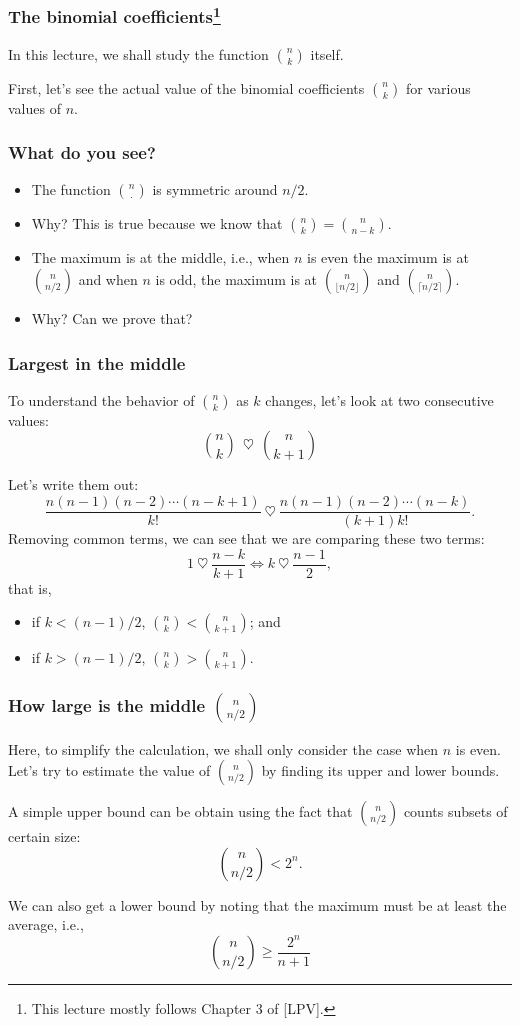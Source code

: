 

\begin{frame}\frametitle{The binomial coefficients\footnote{This lecture mostly follows Chapter 3 of [LPV].}}
  In this lecture, we shall study the function $\binom{n}{k}$ itself.

  First, let's see the actual value of the binomial coefficients
  $\binom{n}{k}$ for various values of $n$.  \vspace{2in}
\end{frame}

\begin{frame}\frametitle{What do you see?}
  \begin{itemize}
  \item The function $\binom{n}{\cdot}$ is symmetric around $n/2$.
  \item Why? \pause This is true because we know that $\binom{n}{k}=\binom{n}{n-k}$. \pause
  \item The maximum is at the middle, i.e., when $n$ is even the
    maximum is at $\binom{n}{n/2}$ and when $n$ is odd, the maximum is
    at $\binom{n}{\lfloor n/2 \rfloor}$ and $\binom{n}{\lceil
      n/2\rceil}$.
  \item Why? \pause Can we prove that?
  \end{itemize}
\end{frame}

\begin{frame}\frametitle{Largest in the middle}
  To understand the behavior of $\binom{n}{k}$ as $k$ changes, let's
  look at two consecutive values:
  \[ \binom{n}{k} \ \ \heartsuit \ \ \binom{n}{k+1}\]
  \pause

  Let's write them out:
  \[ \frac{n(n-1)(n-2)\cdots(n-k+1)}{k!} \ \heartsuit \ \frac{n(n-1)(n-2)\cdots(n-k)}{(k+1)k!}.\]
  \pause
  Removing common terms, we can see that we are comparing these two terms:
  \[ 1 \ \heartsuit \ \frac{n-k}{k+1} \Leftrightarrow k \ \heartsuit \ \frac{n-1}{2},\]
  that is, \pause
  \begin{itemize}
  \item if $k<(n-1)/2$, $\binom{n}{k} < \binom{n}{k+1}$; and
  \item if $k>(n-1)/2$, $\binom{n}{k} > \binom{n}{k+1}$.
  \end{itemize}
\end{frame}

\begin{frame}\frametitle{How large is the middle $\binom{n}{n/2}$}
  Here, to simplify the calculation, we shall only consider the case
  when $n$ is even. Let's try to estimate the value of
  $\binom{n}{n/2}$ by finding its upper and lower bounds.
  \pause

  A simple upper bound can be obtain using the fact that
  $\binom{n}{n/2}$ counts subsets of certain size:
  \[\binom{n}{n/2} < 2^n.\]
  \pause

  We can also get a lower bound by noting that the maximum must be at
  least the average, i.e.,
  \[\binom{n}{n/2} \geq \frac{2^n}{n+1}\]
\end{frame}

